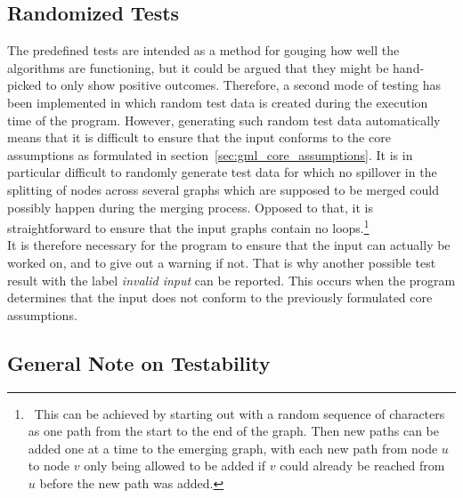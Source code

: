 \documentclass[a4paper,12pt,twoside,BCOR=10mm]{scrbook}
\begin{document}
\subsection{Randomized Tests}

The predefined tests are intended as a method for gouging how well the algorithms 
are functioning, but it could be argued that they might be hand-picked 
to only show positive outcomes. 
Therefore, a second mode of testing has been implemented 
in which random test data is created during the execution time of the program. 
However, generating such random test data automatically means 
that it is difficult to ensure that the input conforms 
to the core assumptions as formulated in section~\ref{sec:gml_core_assumptions}. 
It is in particular difficult to randomly generate test data for which 
no spillover in the splitting of nodes across several graphs which are 
supposed to be merged could possibly happen during the merging process. 
Opposed to that, it is straightforward to ensure that the input graphs 
contain no loops.\footnote{\,\,\,This can be achieved by starting out with a 
random sequence of characters as one path from the start to the end 
of the graph. 
Then new paths can be added one at a time to the emerging 
graph, with each new path from node $ u $ to node $ v $ only being 
allowed to be added if $ v $ could already be reached from $ u $ before 
the new path was added.} \\
It is therefore necessary for the program to ensure that the 
input can actually be worked on, and to give out a warning if not. 
That is why another possible test result with the label \textit{invalid input} can be reported. 
This occurs when the program determines that the input does not conform 
to the previously formulated core assumptions. 

\subsection{General Note on Testability}
\end{document}
